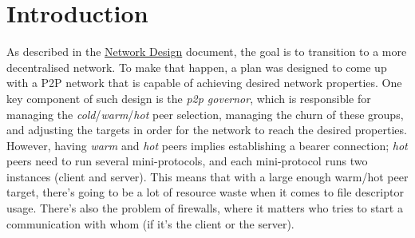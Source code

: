 \def\RemoteEstablished{\textsf{RemoteEstablished}}
\def\RemoteIdle{\textsf{RemoteIdle}\textsuperscript{$\tau$}}
\def\RemoteCold{\textsf{RemoteCold}}
\def\RemoteWarm{\textsf{RemoteWarm}}
\def\RemoteHot{\textsf{RemoteHot}}

\def\NewInboundConnection{\textsf{NewConnection Inbound}}
\def\NewOutboundConnection{\textsf{NewConnection Outbound}}
\def\NewConnection{\textsf{NewConnection}}
\def\NewConnectionAny{\textsf{NewConnection provenance}}
\def\AwakeRemote{\textsf{AwakeRemote}}
\def\RemoteToCold{\textsf{RemoteToCold}}
\def\CommitRemote{\textsf{CommitRemote}}
\def\MiniProtocolTerminated{\textsf{MiniProtocolTerminated}}
\def\MuxTerminated{\textsf{MuxTerminated}}
\def\PromotedToHotRemote{\textsf{PromotedToHotRemote}}
\def\DemotedToWarmRemote{\textsf{DemotedToWarmRemote}}
\def\WaitIdleRemote{\textsf{WaitIdleRemote}}

\def\cold{\textit{cold}}
\def\warm{\textit{warm}}
\def\hot{\textit{hot}}
\def\established{\textit{established}}

\def\keepAlive{\textsf{keep-alive}}
\def\tipSample{\textsf{tip-sample}}

\def\ptopgov{\textit{p2p governor}}
\def\mux{\textit{mux}}
\def\inbgov{\textit{inbound protocol governor}}
\def\Inbgov{\textit{Inbound protocol governor}}
\def\connmngr{\textit{connection manager}}
\def\Connmngr{\textit{Connection manager}}
\def\True{\texttt{True}}
\def\False{\texttt{False}}

\newcommand{\todoimpl}[1]{\todo[backgroundcolor=red,linecolor=red]{#1}}

\section{Introduction}

As described in the \href{https://ouroboros-network.cardano.intersectmbo.org/pdfs/network-design}{Network Design} document, the goal is to transition to a more
decentralised network. To make that happen, a plan was designed to come up with a P2P
network that is capable of achieving desired network properties. One key component of
such design is the \ptopgov{}, which is responsible for managing the \cold{}/\warm{}/\hot{}
peer selection, managing the churn of these groups, and adjusting the targets in order for
the network to reach the desired properties. However, having \warm{} and \hot{} peers implies
establishing a bearer connection; \hot{} peers need to run several mini-protocols, and each
mini-protocol runs two instances (client and server). This means that with a large enough
warm/hot peer target, there's going to be a lot of resource waste when it comes to file
descriptor usage. There's also the problem of firewalls, where it matters who tries to
start a communication with whom (if it's the client or the server).

